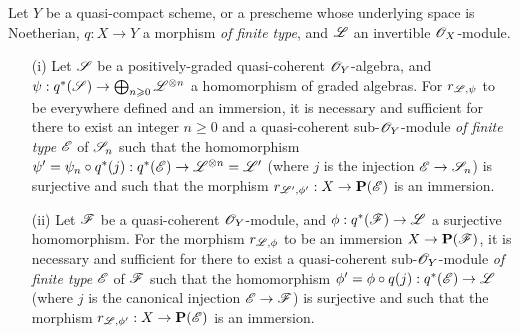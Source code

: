 \begin{proposition}[4.4.1]
\label{II.4.4.1}
Let $Y$ be a quasi-compact scheme, or a prescheme whose underlying space is Noetherian, $q:X\to Y$ a morphism \emph{of finite type}, and $\mathscr{L}$ an invertible $\mathscr{O}_X$-module.
\begin{enumerate}
  \item[\rm{(i)}] Let $\mathscr{S}$ be a positively-graded quasi-coherent $\mathscr{O}_Y$-algebra, and $\psi:q^*(\sh{S})\to\bigoplus_{n\geq0}\sh{L}^{\otimes n}$ a homomorphism of graded algebras.
    For $r_{\mathscr{L},\psi}$ to be everywhere defined and an immersion, it is necessary and
    sufficient for there to exist an integer $n\geq0$ and a quasi-coherent sub-$\mathscr{O}_Y$-module \emph{of finite type} $\mathscr{E}$ of $\mathscr{S}_n$ such that the homomorphism $\psi'=\psi_n\circ q^*(j):q^*(\sh{E})\to\sh{L}^{\otimes n}=\sh{L}'$ (where $j$ is the injection $\sh{E}\to\sh{S}_n$) is surjective and such that the morphism $r_{\sh{L}',\vphi'}:X\to\bb{P}(\sh{E})$ is an immersion.
  \item[\rm{(ii)}] Let $\mathscr{F}$ be a quasi-coherent $\mathscr{O}_Y$-module, and $\vphi:q^*(\sh{F})\to\sh{L}$ a surjective homomorphism.
    For the morphism $r_{\mathscr{L},\phi}$ to be an immersion $X\to\bb{P}(\sh{F})$, it is necessary and sufficient for there to exist a quasi-coherent sub-$\mathscr{O}_Y$-module \emph{of finite type} $\mathscr{E}$ of $\mathscr{F}$ such that the homomorphism $\vphi'=\vphi\circ q(j):q^*(\sh{E})\to\sh{L}$ (where $j$ is the canonical injection $\sh{E}\to\sh{F}$) is surjective and such that the morphism $r_{\sh{L},\vphi'}:X\to\bb{P}(\sh{E})$ is an immersion.
\end{enumerate}
\end{proposition}

